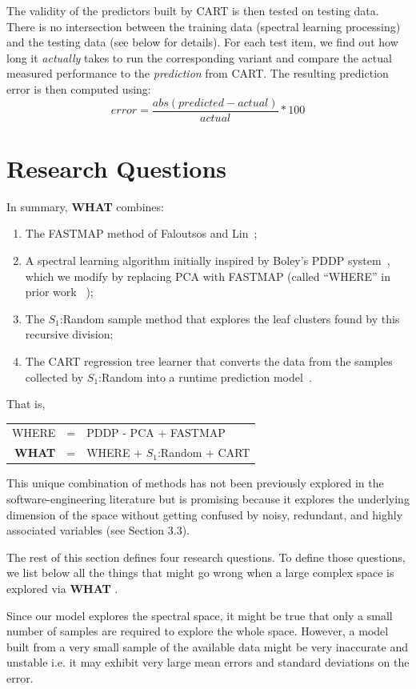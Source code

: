 \documentclass{sig-alternative}
\newcommand{\be}{\begin{enumerate}}
\newcommand{\ee}{\end{enumerate}}
\newcommand{\what}{{\bf WHAT }}
\begin{document}
The validity of the predictors built by CART  is then tested on testing data. There is no intersection between the training data (spectral learning processing) and the testing data (see below for details). 
For each  test item, we find out how long it {\em actually} takes to run the corresponding variant and compare the actual measured performance to the {\em prediction} from CART. The resulting prediction error is then computed using:
\begin{equation}\label{eq:err}
\mathit{error}=\frac{\mathit{abs}(\mathit{predicted} - \mathit{actual})}{\mathit{actual}}*100
\end{equation}

\section{Research Questions} 
In summary, \what  combines:
\be
\item
The FASTMAP method of Faloutsos and Lin~\cite{Faloutsos1995};
\item A spectral learning algorithm initially   inspired by    Boley's PDDP system~\cite{boley98}, which we modify
by replacing  PCA with FASTMAP (called
``WHERE'' in prior work ~\cite{me12d});
\item
The $S_1$:Random sample method that explores the leaf clusters found by this recursive division;
\item 
The CART regression tree learner that converts the data from the samples collected by $S_1$:Random
into a runtime prediction model~\cite{breiman1984}.
\ee
That is,
\begin{center}
\begin{tabular}{rcl}
WHERE& = &PDDP - PCA + FASTMAP\\ 
\what& =  & WHERE + $S_1$:Random + CART
\end{tabular}
\end{center}
This unique combination of methods has not been previously explored in the
software-engineering literature but is promising because it explores the underlying dimension of the space without getting confused by noisy, redundant, and highly associated variables (see Section 3.3).

The rest of this section defines four research questions. To
define those questions, we list below all the things that might go
wrong when a large complex space is explored via \what.

Since our model explores the spectral space, it might be true that only a small
number of samples are required to explore the whole space.
However, a model built from a very small sample of the available data might
be very inaccurate and unstable i.e. it may exhibit very large mean errors and standard deviations on the error.
\end{document}
